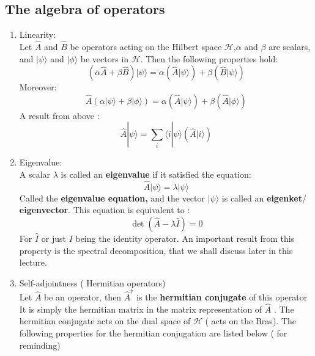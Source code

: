  \subsection{The algebra of operators}
 \begin{enumerate}
 	\item Linearity:\\
 	Let $\hat{A}$ and $ \hat{B}$ be operators acting on the Hilbert space $ \mathcal{H}$,$ \alpha$ and $ \beta$ are scalars, and $ | \psi \rangle $ and  $ | \phi \rangle$ be vectors in $ \mathcal{H}$. Then the following properties hold:
 	\begin{equation}
 	(\alpha \hat{A}+ \beta \hat{B}) | \psi\rangle = \alpha (\hat{A} | \psi\rangle)+ \beta ( \hat{B} |\psi\rangle)
 	\end{equation}
 	Moreover:
 	\begin{equation}
 	\hat{A}	(\alpha | \psi\rangle+ \beta  | \phi\rangle ) = \alpha (\hat{A} | \psi\rangle)+ \beta ( \hat{A} |\phi\rangle)
 	\end{equation}
 	A result from above :
 	\begin{equation}
 	\hat{A} | \psi\rangle = \sum_i \langle i|\psi \rangle\left(  \hat{A} | i \rangle\right) 
 	\end{equation}
 	\item Eigenvalue:\\
 	A scalar $ \lambda $ is called an \textbf{eigenvalue} if it satisfied the equation:
 	\begin{equation}
 	\hat{A} | \psi\rangle = \lambda  | \psi\rangle
 	\end{equation}
 	Called the\textbf{ eigenvalue equation,} and the vector $ | \psi\rangle$ is called an \textbf{eigenket}/ \textbf{eigenvector}. 
 	This equation is equivalent to :
 	\begin{equation}
 	\det\left( \hat{A} - \lambda \hat{I}\right)  =0 
 	\end{equation}
 	For $ \hat{I}$ or just $ I$ being the identity operator. 
 	An important result from this property is the spectral decomposition, that we shall discuss later in this lecture.
 	\item Self-adjointness ( Hermitian operators)\\
 	Let $ \hat{A}$ be an operator, then $ \hat{A}^\dagger$ is the \textbf{hermitian conjugate} of this operator  It is simply the hermitian matrix in the matrix representation of $ \hat{A}$ . The hermitian conjugate acts on the dual space of $ \mathcal{H}$ ( acts on the Bras).  The following properties for the hermitian conjugation are listed below ( for reminding)

\end{enumerate}
